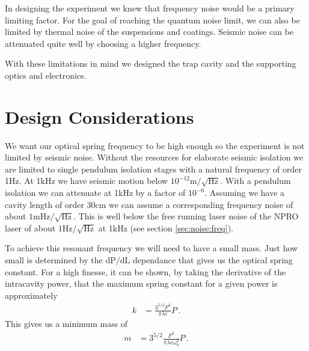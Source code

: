 \acresetall

In designing the experiment we knew that frequency noise would be a
primary limiting factor.
For the goal of reaching the quantum noise limit, we can also be limited
by thermal noise of the suspensions and coatings.
Seismic noise can be attenuated quite well by choosing a higher frequency.

With these limitations in mind we designed the trap cavity and the supporting
optics and electronics.

%
%


\section{Design Considerations}
\label{sec:lintrap:design}

We want our optical spring frequency to be high enough so the experiment is
not limited by seismic noise.
Without the resources for elaborate seismic isolation we are limited to single
pendulum isolation stages with a natural frequency of order 1Hz.
At 1kHz we have seismic motion below $10^{-12} \mathrm{m/\sqrt{Hz}}$.
With a pendulum isolation we can attenuate at 1kHz by a factor of $10^{-6}$.
Assuming we have a cavity length of order 30cm we can assume a corresponding
frequency noise of about $1 \mathrm{mHz/\sqrt{Hz}}$.
This is well below the free running laser noise of the NPRO laser of about
$1\mathrm{Hz/\sqrt{Hz}}$ at 1kHz (see section \ref{sec:noise:freq}).


To achieve this resonant frequency we will need to have a small mass.
Just how small is determined by the $\mathrm{dP/dL}$ dependance that gives
us the optical spring constant.
For a high finesse, it can be shown, by taking the derivative of the
intracavity power,
that the maximum spring constant for a given power is approximately
\begin{align}
k &= \frac{3^{5/2} F^2}{\pi \lambda c} P \,.
\end{align}
This gives us a minimum mass of
\begin{align}
m &= 3^{5/2} \frac{F^2}{\pi \lambda c \omega^2_0} P \, .
\end{align}


